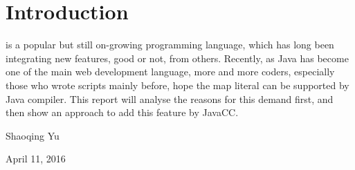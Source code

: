 	
	
	\section{Introduction}
	 is a popular but still on-growing programming language, which has long been integrating new features, good or not, from others. Recently, as Java has become one of the main web development language, more and more coders, especially those who wrote scripts mainly before, hope the map literal can be supported by Java compiler. This report will analyse the reasons for this demand first, and then show an approach to add this feature by JavaCC. 
	
	\hfill Shaoqing Yu
	
	\hfill April 11, 2016
	
	
	
